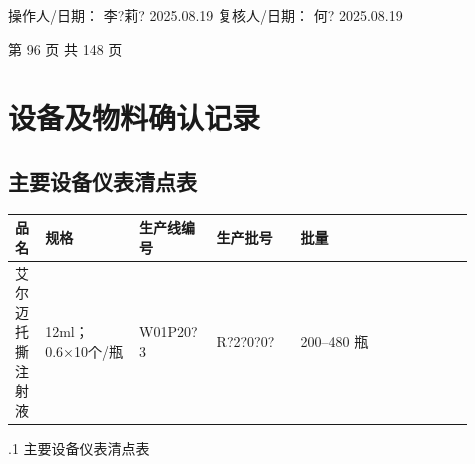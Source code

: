 \documentclass[UTF8,10pt,a4paper,fontset=fandol]{ctexart}
\newcommand{\fieldvalue}[1]{#1}
\newcommand{\handwritten}[1]{#1}
\begin{document}
操作人/日期：
\fieldvalue{\handwritten{李?莉?}}
\quad
\fieldvalue{\handwritten{2025.08.19}}
\hfill
复核人/日期：
\fieldvalue{\handwritten{何?}}
\quad
\fieldvalue{\handwritten{2025.08.19}}

\begin{center}
第 96 页 共 148 页
\end{center}

\newpage

\section{设备及物料确认记录}

\subsection{主要设备仪表清点表}

\begin{center}
\small
\begin{tabular}{|p{0.06\linewidth}|p{0.19\linewidth}|p{0.14\linewidth}|p{0.17\linewidth}|p{0.19\linewidth}|p{0.16\linewidth}|}
\hline
品名 & 规格 & 生产线编号 & 生产批号 & 批量 \\
\hline
艾尔迈托撕注射液 & 12ml；0.6×10个/瓶 & 
\fieldvalue{\handwritten{W01P20?3}} &
\fieldvalue{\handwritten{R?2?0?0?}} &
200--480 瓶 \\
\hline
\end{tabular}
\end{center}

.1 主要设备仪表清点表
\end{document}

